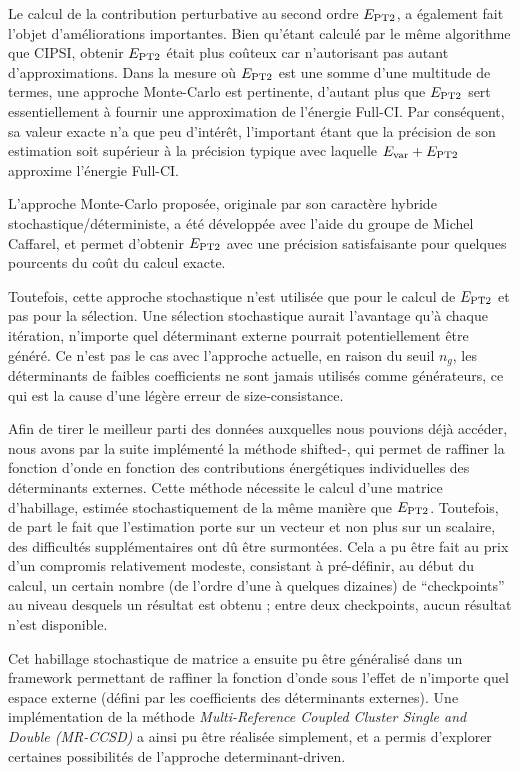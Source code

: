 \documentclass[./thesis.tex]{subfiles}
\begin{document}
Le calcul de la contribution perturbative au second ordre $E_\text{PT2}$, a également fait l'objet d'améliorations importantes. Bien qu'étant calculé par le même algorithme que CIPSI, obtenir $E_\text{PT2}$ était plus coûteux car n'autorisant pas autant d'approximations. Dans la mesure où $E_\text{PT2}$ est une somme d'une multitude de termes, une approche Monte-Carlo est pertinente, d'autant plus que $E_\text{PT2}$ sert essentiellement à fournir une approximation de l'énergie Full-CI. Par conséquent, sa valeur exacte n'a que peu d’intérêt, l'important étant que la précision de son estimation soit supérieur à la précision typique avec laquelle $E_{\text{var}} + E_\text{PT2}$ approxime l'énergie Full-CI.

L'approche Monte-Carlo proposée, originale par son caractère hybride stochastique/déterministe, a été développée avec l'aide du groupe de Michel Caffarel, et permet d'obtenir $E_\text{PT2}$ avec une précision satisfaisante pour quelques pourcents du coût du calcul exacte.

Toutefois, cette approche stochastique n'est utilisée que pour le calcul de $E_\text{PT2}$ et pas pour la sélection. Une sélection stochastique aurait l'avantage qu'à chaque itération, n'importe quel déterminant externe pourrait potentiellement être généré. Ce n'est pas le cas avec l'approche actuelle, en raison du seuil $n_g$, les déterminants de faibles coefficients ne sont jamais utilisés comme générateurs, ce qui est la cause d'une légère erreur de size-consistance.

Afin de tirer le meilleur parti des données auxquelles nous pouvions déjà accéder, nous avons par la suite implémenté la méthode shifted-\Bk, qui permet de raffiner la fonction d'onde en fonction des contributions énergétiques individuelles des déterminants externes. Cette méthode nécessite le calcul d'une matrice d'habillage, estimée stochastiquement de la même manière que $E_\text{PT2}$. Toutefois, de part le fait que l'estimation porte sur un vecteur et non plus sur un scalaire, des difficultés supplémentaires ont dû être surmontées. Cela a pu être fait au prix d'un compromis relativement modeste, consistant à pré-définir, au début du calcul, un certain nombre (de l'ordre d'une à quelques dizaines) de ``checkpoints'' au niveau desquels un résultat est obtenu ; entre deux checkpoints, aucun résultat n'est disponible.

Cet habillage stochastique de matrice a ensuite pu être généralisé dans un framework permettant de raffiner la fonction d'onde sous l'effet de n'importe quel espace externe (défini par les coefficients des déterminants externes). Une implémentation de la méthode \emph {Multi-Reference Coupled Cluster Single and Double (MR-CCSD)} a ainsi pu être réalisée simplement,\cite{Garniron_2017} et a permis d'explorer certaines possibilités de l'approche determinant-driven. 
\end{document}
